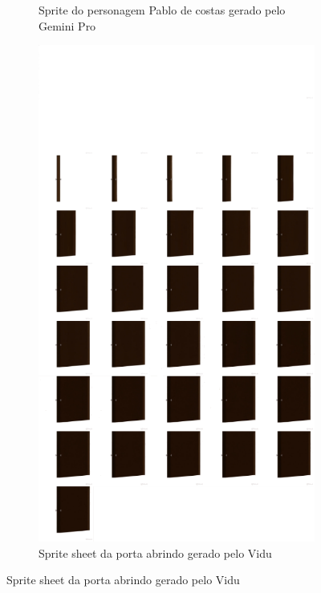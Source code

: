 \begin{figure}[htbp]
\begin{subfigure}{0.45\linewidth}
        \caption{\small Sprite do personagem Pablo de costas gerado pelo Gemini Pro}
        \label{fig:pixelLabPabloGeminiProCostas}
    \end{subfigure}
    \begin{subfigure}{0.45\linewidth}
        \centering
        \includegraphics[width=1\linewidth]{figs/vidu/Pixilart/porta_sprite_sheet_pixel.png}
        \caption{\small Sprite sheet da porta abrindo gerado pelo Vidu}
        \label{fig:pixelLabPortaViduSideView}

\end{subfigure}
\end{figure}
